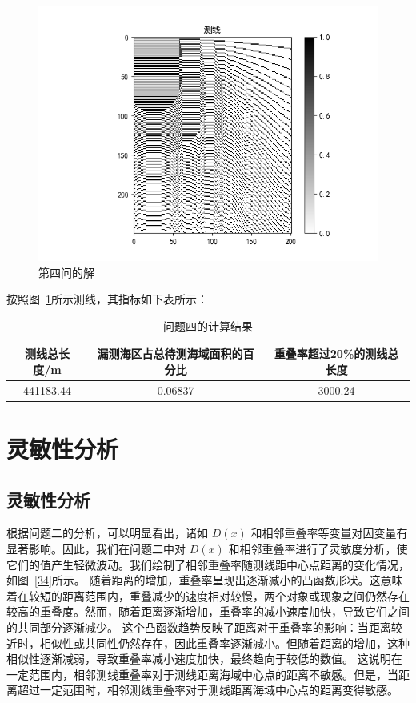 \documentclass[withoutpreface,bwprint]{cumcmthesis} %
\begin{document}
               \begin{figure}[htbp]
                \centering
                \includegraphics[width=.7\textwidth]{第三问答案.png}
                \caption{第四问的解}
                \label{19}
            \end{figure}
               按照图~\ref{19}所示测线，其指标如下表所示：
    \begin{table}[!htbp]
        \caption{问题四的计算结果} 
        \centering
        \begin{tabular}{ccc}
            \toprule[2pt]
            测线总长度/m & 漏测海区占总待测海域面积的百分比 & 重叠率超过20\%的测线总长度 \\
            \midrule[1pt]
            441183.44 & 0.06837 & 3000.24\\
            \bottomrule[2pt]
        \end{tabular}
    \end{table}
    
   
    
    \section{灵敏性分析}
    \subsection{灵敏性分析}
    根据问题二的分析，可以明显看出，诸如 $D(x)$ 和相邻重叠率等变量对因变量有显著影响。因此，我们在问题二中对 $D(x)$ 和相邻重叠率进行了灵敏度分析，使它们的值产生轻微波动。我们绘制了相邻重叠率随测线距中心点距离的变化情况，如图~\ref{34}所示。 
    随着距离的增加，重叠率呈现出逐渐减小的凸函数形状。这意味着在较短的距离范围内，重叠减少的速度相对较慢，两个对象或现象之间仍然存在较高的重叠度。然而，随着距离逐渐增加，重叠率的减小速度加快，导致它们之间的共同部分逐渐减少。
    这个凸函数趋势反映了距离对于重叠率的影响：当距离较近时，相似性或共同性仍然存在，因此重叠率逐渐减小。但随着距离的增加，这种相似性逐渐减弱，导致重叠率减小速度加快，最终趋向于较低的数值。
    这说明在一定范围内，相邻测线重叠率对于测线距离海域中心点的距离不敏感。但是，当距离超过一定范围时，相邻测线重叠率对于测线距离海域中心点的距离变得敏感。
    
\end{document}
